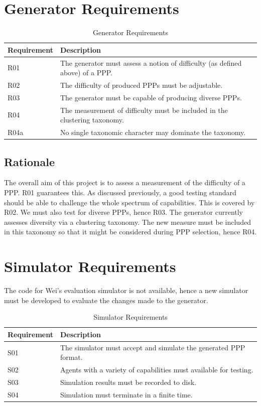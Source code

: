 \documentclass[authoryearcitations]{UoYCSproject}
\begin{document}
\section{Generator Requirements}
\label{sec:pa4}
\begin{table}
\begin{tabular}{|l | p{13cm}|}
\hline
Requirement & Description \\
\hline
R01 & The generator must assess a notion of difficulty (as defined above) of a PPP.\\
R02 & The difficulty of produced PPPs must be adjustable.\\
R03 & The generator must be capable of producing diverse PPPs.\\
R04 & The measurement of difficulty must be included in the clustering taxonomy.\\
R04a & No single taxonomic character may dominate the taxonomy.\\
\hline
\end{tabular}
\caption{Generator Requirements}
\label{table:genreq}
\end{table}

\subsection{Rationale}
\label{sec:pa4_rat}
The overall aim of this project is to assess a measurement of the difficulty of a PPP. R01 guarantees this. As discussed previously, a good testing standard should be able to challenge the whole spectrum of capabilities. This is covered by R02. We must also test for diverse PPPs, hence R03. The generator currently assesses diversity via a clustering taxonomy. The new measure must be included in this taxonomy so that it might be considered during PPP selection, hence R04.

\section{Simulator Requirements}
\label{sec:pa5}
The code for Wei's evaluation simulator is not available, hence a new simulator must be developed to evaluate the changes made to the generator.\\

\begin{table}
\begin{tabular}{|l | p{13cm}|}
\hline
Requirement & Description \\
\hline
S01 & The simulator must accept and simulate the generated PPP format.\\
S02 & Agents with a variety of capabilities must available for testing.\\
S03 & Simulation results must be recorded to disk.\\
S04 & Simulation must terminate in a finite time.\\
\hline
\end{tabular}
\caption{Simulator Requirements}
\label{table:simreq}
\end{table}
\end{document}
